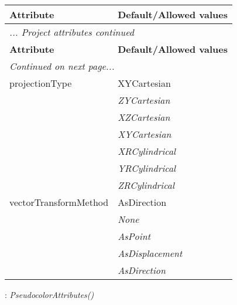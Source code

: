 \documentclass[10pt,a4paper]{report}
\begin{document}
\begin{longtable}{ll}
{\bf Attribute} & {\bf Default/Allowed values} \\
\hline \hline
\endfirsthead
\multicolumn{2}{l}{{\it ... Project attributes continued}} \\
{\bf Attribute} & {\bf Default/Allowed values} \\
\hline \hline
\endhead
\hline
\multicolumn{2}{l}{{\it Continued on next page...}} \\
\endfoot
\hline
\endlastfoot

projectionType  &  XYCartesian   \\
 & {\it  ZYCartesian} \\
 & {\it  XZCartesian} \\
 & {\it  XYCartesian} \\
 & {\it  XRCylindrical} \\
 & {\it  YRCylindrical} \\
 & {\it  ZRCylindrical} \\
vectorTransformMethod  &  AsDirection   \\
 & {\it  None} \\
 & {\it  AsPoint} \\
 & {\it  AsDisplacement} \\
 & {\it  AsDirection} \\
\end{longtable}

\newpage

{}
: {\it PseudocolorAttributes() }\\[-3mm]
\end{document}
